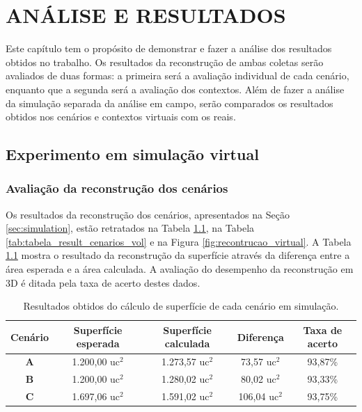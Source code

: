 
\chapter{ANÁLISE E RESULTADOS}
\label{chap:resultados}

Este capítulo tem o propósito de demonstrar e fazer a análise dos resultados obtidos no trabalho.
Os resultados da reconstrução de ambas coletas serão avaliados de duas formas: a primeira será a avaliação individual de cada cenário, enquanto que a segunda será a avaliação dos contextos.
Além de fazer a análise da simulação separada da análise em campo, serão comparados os resultados obtidos nos cenários e contextos virtuais com os reais.


\section{Experimento em simulação virtual}

\subsection{Avaliação da reconstrução dos cenários}
\label{sec:avaliacao_cenarios_simulacao}

Os resultados da reconstrução dos cenários, apresentados na Seção \ref{sec:simulation}, estão retratados na Tabela  \ref{tab:tabela_result_cenarios_sup}, na Tabela \ref{tab:tabela_result_cenarios_vol} e na Figura \ref{fig:recontrucao_virtual}.
A Tabela \ref{tab:tabela_result_cenarios_sup} mostra o resultado da reconstrução da superfície através da diferença entre a área esperada e a área calculada.
A avaliação do desempenho da reconstrução em 3D é ditada pela taxa de acerto destes dados.

\begin{table}[H]
    \centering
    \caption{Resultados obtidos do cálculo de superfície de cada cenário em simulação.}
    \begin{tabular}{@{}ccccc@{}}
        \toprule
        \textbf{Cenário} & \textbf{Superfície esperada} & \textbf{Superfície calculada} & \textbf{Diferença} & \textbf{Taxa de acerto} \\ \midrule
        \textbf{A} & 1.200,00 uc$^2$ & 1.273,57 uc$^2$ & 73,57 uc$^2$ & 93,87\% \\
        \textbf{B} & 1.200,00 uc$^2$ & 1.280,02 uc$^2$ & 80,02 uc$^2$ & 93,33\% \\
        \textbf{C} & 1.697,06 uc$^2$ & 1.591,02 uc$^2$ & 106,04 uc$^2$ & 93,75\% \\ \bottomrule
    \end{tabular}
    \label{tab:tabela_result_cenarios_sup}
\end{table}


